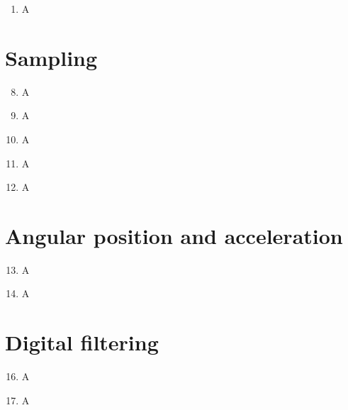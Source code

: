 \documentclass[a4paper,12pt]{article}
\begin{document}
\begin{enumerate}[label={\color{blue}\arabic*)}]
\begin{multicols}{2}
\begin{lstlisting}[style=Matlab-editor,language=Matlab, basicstyle=\small\ttfamily]
% plot of filtered signal
figure(1);
plot(t1,Sf,'r')
grid on
legend(' \omega(t) unfiltered','\omega_{f}(t) filtered','Fontsize',14)
        \end{lstlisting}

    \end{multicols}

    On Simulink :

    \item
    A

\end{enumerate}

\newpage
\section{Sampling}

\begin{enumerate}[label={\color{blue}\arabic*)}]
    \setcounter{enumi}{7}

    \item
    A

    \item
    A

    \item
    A

    \item
    A

    \item
    A

\end{enumerate}

\newpage
\section{Angular position and acceleration}

\begin{enumerate}[label={\color{blue}\arabic*)}]
    \setcounter{enumi}{12}

    \item
    A

    \item
    A

\end{enumerate}

\newpage
\section{Digital filtering}

\begin{enumerate}[label={\color{blue}\arabic*)}]
    \setcounter{enumi}{15}

    \item
    A

    \item
    A

\end{enumerate}
\end{document}
